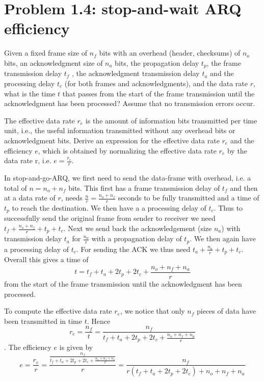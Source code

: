 \documentclass[a4paper,10pt]{article}
\begin{document}
\section{Problem 1.4: stop-and-wait ARQ efficiency}

Given a fixed frame size of $n_f$ bits with an overhead (header, checksums) of $n_o$ bits, an acknowledgment size of $n_a$ bits, the propagation delay $t_p$, the frame transmission delay $t_f$ , the acknowledgment transmission delay $t_a$ and the processing delay $t_c$ (for both frames and acknowledgments), and the data rate $r$, what is the time $t$ that passes from the start of the frame transmission until the acknowledgment has been processed? Assume that no transmission errors occur.

The effective data rate $r_e$ is the amount of information bits transmitted per time unit, i.e., the useful information transmitted without any overhead bits or acknowledgment bits. Derive an expression for the effective data rate $r_e$ and the efficiency $e$, which is obtained by normalizing the effective data rate $r_e$ by the data rate r, i.e. $e = \frac{r_e}{r}$.

In stop-and-go-ARQ, we first need to send the data-frame with overhead, i.e. a total of $n = n_o + n_f$ bits. This first has a frame transmission delay of $t_f$ and then at a data rate of $r$, needs $\frac{n}{r} = \frac{n_o + n_f}{r}$ seconds to be fully transmitted and a time of  $t_p$ to reach the destination. We then have a a processing delay of $t_c$. Thus to successfully send the original frame from sender to receiver we need $t_f + \frac{n_o + n_f}{r} + t_p + t_c$. Next we send back the acknowledgement (size $n_a$)  with transmission delay $t_a$ for $\frac{n_a}{r}$  with a propagnation delay of $t_p$. We then again have a processing delay of $t_c$. For sending the ACK we thus need $t_a + \frac{n_a}{r} + t_p + t_c$.
Overall this gives a time of
$$ t = t_f + t_a + 2 t_p + 2 t_c + \frac{n_o + n_f + n_a}{r}$$
from the start of the frame transmission until the acknowledgment has been processed.

To compute the effective data rate $r_e$, we notice that only $n_f$ pieces of data have been transmitted in time $t$. Hence
$$r_e = \frac{n_f}{t} = \frac{n_f}{t_f + t_a + 2 t_p + 2 t_c + \frac{n_o + n_f + n_a}{r}}$$
. The efficiency $e$ is given by
$$e = \frac{r_e}{r} = \frac{\frac{n_f}{t_f + t_a + 2 t_p + 2 t_c + \frac{n_o + n_f + n_a}{r}}}{r} = \frac{n_f}{r \left( t_f + t_a + 2 t_p + 2 t_c \right) + n_o + n_f + n_a}$$
\end{document}
